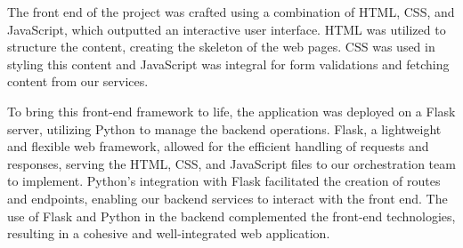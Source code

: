 The front end of the project was crafted using a combination of HTML, CSS, and JavaScript, which outputted an interactive user interface. HTML was utilized to structure the content, creating the skeleton of the web pages. CSS was used in styling this content and JavaScript was integral for form validations and fetching content from our services.

To bring this front-end framework to life, the application was deployed on a Flask server, utilizing Python to manage the backend operations. Flask, a lightweight and flexible web framework, allowed for the efficient handling of requests and responses, serving the HTML, CSS, and JavaScript files to our orchestration team to implement. Python's integration with Flask facilitated the creation of routes and endpoints, enabling our backend services to interact with the front end. The use of Flask and Python in the backend complemented the front-end technologies, resulting in a cohesive and well-integrated web application.
